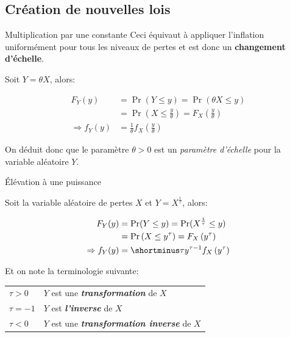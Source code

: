 \documentclass[10pt, french]{article}
\begin{document}
\begin{multicols*}{3}
\setcounter{section}{5}

\section{Création de nouvelles lois}

\begin{algo}{Multiplication par une constante}
Ceci équivaut à appliquer l'inflation uniformément pour tous les niveaux de pertes et est donc un \textbf{changement d'échelle}.

Soit $Y = \theta X$, alors:

\begin{align*}
	F_Y(y)
	&=	\Pr(Y \leq y)	
	=	\Pr(\theta X \leq y)	\\
	&=	\Pr\left(X \leq \frac{y}{\theta}\right)	
	=	F_X\left(\frac{y}{\theta}\right)	\\
\Rightarrow	f_Y(y)
	&=	\frac{1}{\theta} f_X\left(\frac{y}{\theta}\right)
\end{align*}

On déduit donc que le paramètre $\theta > 0$ est un \textit{paramètre d'échelle} pour la variable aléatoire $Y$.

\end{algo}

\begin{algo}{Élévation à une puissance}

Soit la variable aléatoire de pertes $X$ et $Y = X^{\frac{1}{\tau}}$, alors:

\begin{align*}
	F_Y(y)
	&=	\Pr(Y \leq y)	
	=	\Pr(X^{\frac{1}{\tau}} \leq y)	\\
	&=	\Pr\left(X \leq y^{\tau}\right)	
	=	F_X\left(y^{\tau}\right)	\\
\Rightarrow	f_Y(y)
	&=	\shortminus \tau y^{\tau - 1} f_X\left(y^{\tau}\right)
\end{align*}

Et on note la terminologie suivante:

\begin{tabular}{|l | l |}
\hline
	$\tau > 0$	&	$Y$ est une \textit{\textbf{transformation}} de $X$	\\
	$\tau = -1$	&	$Y$ est \textit{\textbf{l'inverse}} de $X$	\\
	$\tau < 0$	&	$Y$ est une \textit{\textbf{transformation inverse}} de $X$	\\	\hline
\end{tabular}

\end{algo}


\end{multicols*}
\end{document}
